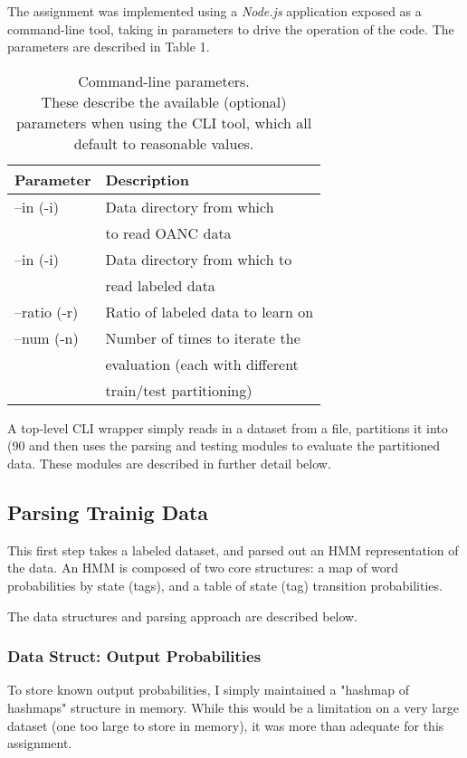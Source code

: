 \documentclass[11pt]{article}
\begin{document}
The assignment was implemented using a {\em Node.js} application exposed as
a command-line tool, taking in parameters to drive the operation of the
code. The parameters are described in Table 1.

\begin{table}[h]
\begin{center}
\begin{tabular}{|l|l|}
\hline \bf Parameter & \bf Description \\ \hline
--in (-i)            & Data directory from which \\
                     & to read OANC data \\
--in (-i)            & Data directory from which to  \\
                     & read labeled data \\
--ratio (-r)         & Ratio of labeled data to learn on \\
--num (-n)           & Number of times to iterate the \\
                     & evaluation (each with different \\
                     & train/test partitioning) \\

\hline
\end{tabular}
\end{center}
\caption{\label{cliParams} Command-line parameters. \\
These describe the available (optional) parameters when using
the CLI tool, which all default to reasonable values.}
\end{table}

A top-level CLI wrapper simply reads in a dataset from a file,
partitions it into (90%
and then uses the parsing and testing modules to evaluate the
partitioned data. These modules are described in further detail
below.

\subsection{Parsing Trainig Data}
This first step takes a labeled dataset, and parsed out an HMM
representation of the data.  An HMM is composed of two core structures:
a map of word probabilities by state (tags), and a table of state (tag)
transition probabilities.

The data structures and parsing approach are described below.

\subsubsection{Data Struct: Output Probabilities}
To store known output probabilities, I simply maintained a
"hashmap of hashmaps" structure in memory.  While this would be a limitation
on a very large dataset (one too large to store in memory), it was more
than adequate for this assignment.
\end{document}
